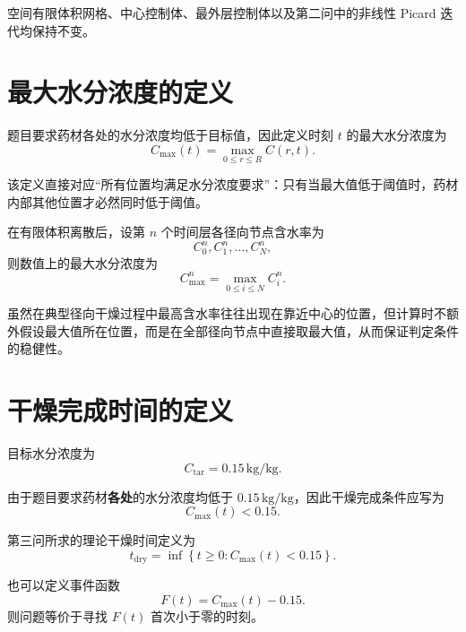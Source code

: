 \documentclass[UTF8,a4paper,12pt]{ctexart}
\begin{document}
空间有限体积网格、中心控制体、最外层控制体以及第二问中的非线性 Picard 迭代均保持不变。

\section{最大水分浓度的定义}

题目要求药材各处的水分浓度均低于目标值，因此定义时刻 $t$ 的最大水分浓度为
\begin{equation}
    \boxed{
    C_{\max}(t)
    =
    \max_{0\le r\le R}C(r,t)
    }.
    \label{eq:Cmax_cont}
\end{equation}

该定义直接对应“所有位置均满足水分浓度要求”：只有当最大值低于阈值时，药材内部其他位置才必然同时低于阈值。

在有限体积离散后，设第 $n$ 个时间层各径向节点含水率为
\[
C_0^n,C_1^n,\ldots,C_N^n,
\]
则数值上的最大水分浓度为
\begin{equation}
    \boxed{
    C_{\max}^n
    =
    \max_{0\le i\le N} C_i^n
    }.
    \label{eq:Cmax_discrete}
\end{equation}

虽然在典型径向干燥过程中最高含水率往往出现在靠近中心的位置，但计算时不额外假设最大值所在位置，而是在全部径向节点中直接取最大值，从而保证判定条件的稳健性。

\section{干燥完成时间的定义}

目标水分浓度为
\begin{equation}
    C_{\mathrm{tar}}=0.15\,\mathrm{kg/kg}.
\end{equation}

由于题目要求药材\textbf{各处}的水分浓度均低于 $0.15\,\mathrm{kg/kg}$，因此干燥完成条件应写为
\begin{equation}
    C_{\max}(t)<0.15.
    \label{eq:dry_condition}
\end{equation}

第三问所求的理论干燥时间定义为
\begin{equation}
    \boxed{
    t_{\mathrm{dry}}
    =
    \inf
    \left\{
        t\ge0:
        C_{\max}(t)<0.15
    \right\}
    }.
    \label{eq:tdry}
\end{equation}

也可以定义事件函数
\begin{equation}
    F(t)=C_{\max}(t)-0.15.
    \label{eq:event}
\end{equation}
则问题等价于寻找 $F(t)$ 首次小于零的时刻。
\end{document}
